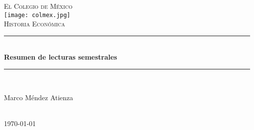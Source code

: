 \begin{titlepage}

\newcommand{\HRule}{\rule{\linewidth}{0.5mm}} 

\center 
 
\textsc{\LARGE El Colegio de México}\\[1.5cm] 
\texttt{[image: colmex.jpg]}\\ 
\textsc{\Large Historia Económica}\\[0.5cm] 

\HRule \\[0.4cm]
{ \huge \bfseries Resumen de lecturas semestrales}\\[0.4cm]
\HRule \\[1.5cm]

\begin{minipage}{0.5\textwidth}
\begin{center} \large
Marco Méndez Atienza\\ 
\end{center}

\end{minipage}\\[2cm]


{\large \today}\\[2cm] 

\vfill 

\end{titlepage}
